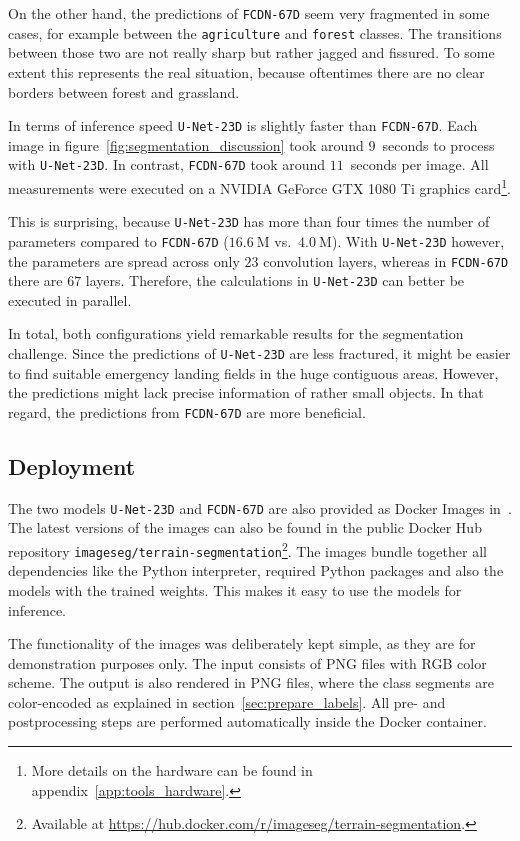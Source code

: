 On the other hand, the predictions of \texttt{FCDN-67D} seem very fragmented in some cases, for example between the \texttt{agriculture} and \texttt{forest} classes. The transitions between those two are not really sharp but rather jagged and fissured. To some extent this represents the real situation, because oftentimes there are no clear borders between forest and grassland.

In terms of inference speed \texttt{U-Net-23D} is slightly faster than \texttt{FCDN-67D}. Each image in figure~\ref{fig:segmentation_discussion} took around $9$~seconds to process with \texttt{U-Net-23D}. In contrast, \texttt{FCDN-67D} took around $11$~seconds per image. All measurements were executed on a NVIDIA GeForce GTX 1080 Ti graphics card\footnote{More details on the hardware can be found in appendix~\ref{app:tools_hardware}.}.

This is surprising, because \texttt{U-Net-23D} has more than four times the number of parameters compared to \texttt{FCDN-67D} ($16.6~\text{M}$ vs.\ $4.0~\text{M}$). With \texttt{U-Net-23D} however, the parameters are spread across only $23$ convolution layers, whereas in \texttt{FCDN-67D} there are $67$ layers. Therefore, the calculations in \texttt{U-Net-23D} can better be executed in parallel.

In total, both configurations yield remarkable results for the segmentation challenge. Since the predictions of \texttt{U-Net-23D} are less fractured, it might be easier to find suitable emergency landing fields in the huge contiguous areas. However, the predictions might lack precise information of rather small objects. In that regard, the predictions from \texttt{FCDN-67D} are more beneficial.

\subsection{Deployment}
The two models \texttt{U-Net-23D} and \texttt{FCDN-67D} are also provided as Docker Images in~\cite{thesis-code20}. The latest versions of the images can also be found in the public Docker Hub repository \texttt{imageseg/terrain-segmentation}\footnote{Available at \url{https://hub.docker.com/r/imageseg/terrain-segmentation}.}. The images bundle together all dependencies like the Python interpreter, required Python packages and also the models with the trained weights. This makes it easy to use the models for inference.

The functionality of the images was deliberately kept simple, as they are for demonstration purposes only. The input consists of PNG files with RGB color scheme. The output is also rendered in PNG files, where the class segments are color-encoded as explained in section~\ref{sec:prepare_labels}. All pre- and postprocessing steps are performed automatically inside the Docker container.

